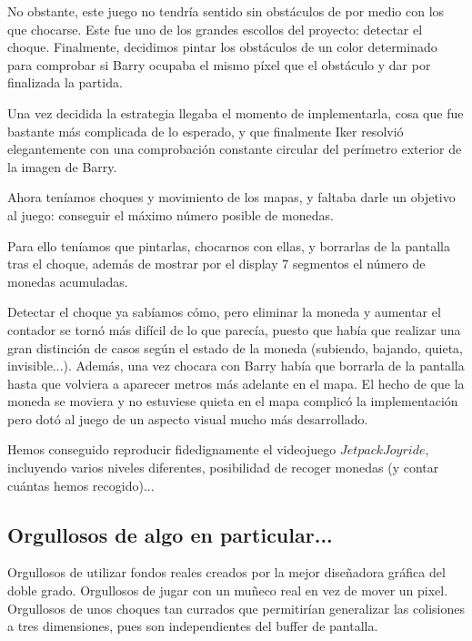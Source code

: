 \documentclass[11pt, a4paper, spanish, openright, twoside]{book}
\begin{document}

No obstante, este juego no tendría sentido sin obstáculos de por medio con los que chocarse.
Este fue uno de los grandes escollos del proyecto: detectar el choque.
Finalmente, decidimos pintar los obstáculos de un color determinado para comprobar si Barry ocupaba el mismo píxel que el obstáculo y dar por finalizada la partida.

Una vez decidida la estrategia llegaba el momento de implementarla, cosa que fue bastante más complicada de lo esperado, y que finalmente Iker resolvió elegantemente con una comprobación constante circular del perímetro exterior de la imagen de Barry.

Ahora teníamos choques y movimiento de los mapas, y faltaba darle un objetivo al juego: conseguir el máximo número posible de monedas.

Para ello teníamos que pintarlas, chocarnos con ellas, y borrarlas de la pantalla tras el choque, además de mostrar por el display 7 segmentos el número de monedas acumuladas.

Detectar el choque ya sabíamos cómo, pero eliminar la moneda y aumentar el contador se tornó más difícil de lo que parecía, puesto que había que realizar una gran distinción de casos según el estado de la moneda (subiendo, bajando, quieta, invisible...). Además, una vez chocara con Barry había que borrarla de la pantalla hasta que volviera a aparecer metros más adelante en el mapa. El hecho de que la moneda se moviera y no estuviese quieta en el mapa complicó la implementación pero dotó al juego de un aspecto visual mucho más desarrollado.



Hemos conseguido reproducir fidedignamente el videojuego $Jetpack Joyride$, incluyendo varios niveles diferentes, posibilidad de recoger monedas (y contar cuántas hemos recogido)...

\subsection{Orgullosos de algo en particular...}

Orgullosos de utilizar fondos reales creados por la mejor diseñadora gráfica del doble grado. Orgullosos de jugar con un muñeco real en vez de mover un pixel. Orgullosos de unos choques tan
 currados que permitirían generalizar las colisiones a tres dimensiones, pues son independientes del buffer de pantalla. 
\end{document}
